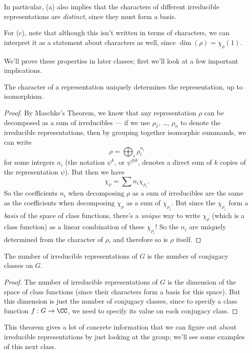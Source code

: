 In particular, (a) also implies that the characters of different irreducible representations are \emph{distinct}, since they must form a basis. 

For (c), note that although this isn't written in terms of characters, we can interpret it as a statement about characters as well, since $\dim(\rho) = \chi_\rho(1)$.

We'll prove these properties in later classes; first we'll look at a few important implications. 

\begin{corollary}
The character of a representation uniquely determines the representation, up to isomorphism. 
\end{corollary}

\begin{proof}
By Maschke's Theorem, we know that any representation $\rho$ can be decomposed as a sum of irreducibles --- if we use $\rho_1$, \ldots, $\rho_n$ to denote the irreducible representations, then by grouping together isomorphic summands, we can write \[\rho = \bigoplus_i \rho_i^{n_i}\] for some integers $n_i$ (the notation $\psi^k$, or $\psi^{\oplus k}$, denotes a direct sum of $k$ copies of the representation $\psi$). But then we have \[\chi_\rho = \sum n_i\chi_{\rho_i}.\] So the coefficients $n_i$ when decomposing $\rho$ as a sum of irreducibles are the same as the coefficients when decomposing $\chi_\rho$ as a sum of $\chi_{\rho_i}$. But since the $\chi_{\rho_i}$ form a \emph{basis} of the space of class functions, there's a \emph{unique} way to write $\chi_\rho$ (which is a class function) as a linear combination of these $\chi_{\rho_i}$! So the $n_i$ are uniquely determined from the character of $\rho$, and therefore so is $\rho$ itself. 
\end{proof}



\begin{corollary}
The number of irreducible representations of $G$ is the number of conjugacy classes on $G$.
\end{corollary}

\begin{proof}
The number of irreducible representations of $G$ is the dimension of the space of class functions (since their characters form a basis for this space). But this dimension is just the number of conjugacy classes, since to specify a class function $f : G \to \CC$, we need to specify its value on each conjugacy class. 
\end{proof}

This theorem gives a lot of concrete information that we can figure out about irreducible representations by just looking at the group; we'll see some examples of this next class. 